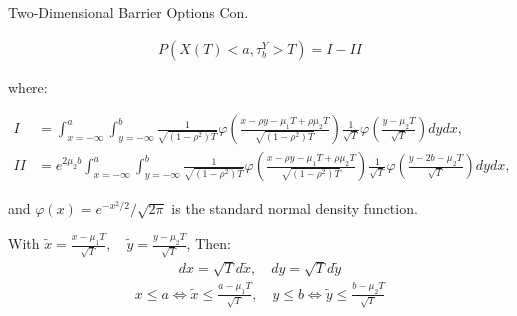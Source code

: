\documentclass{beamer}
\begin{document}
\begin{frame}{Two-Dimensional Barrier Options Con.}

    {\footnotesize \footnotesize
    \begin{align*}
        P(X(T)<a, \tau_b^Y >T)=I - II
    \end{align*}
    \par where:
     {\footnotesize \tiny
    \begin{align*}
        I &= \int_{x=-\infty}^a \int_{y=-\infty}^b \frac{1}{\sqrt{(1-\rho^2)T}} \varphi \left( \frac{x-\rho y-\mu_1 T+\rho\mu_2 T}{\sqrt{(1-\rho^2)T}} \right) \frac{1}{\sqrt{T}} \varphi \left( \frac{y-\mu_2 T}{\sqrt{T}} \right) dy dx, \\
        II &= e^{2\mu_2 b} \int_{x=-\infty}^a \int_{y=-\infty}^b \frac{1}{\sqrt{(1-\rho^2)T}} \varphi \left( \frac{x-\rho y-\mu_1 T+\rho\mu_2 T}{\sqrt{(1-\rho^2)T}} \right) \frac{1}{\sqrt{T}} \varphi \left( \frac{y-2b-\mu_2 T}{\sqrt{T}} \right) dy dx,
        \end{align*}
    
     }
     \par and \(\varphi(x)=e^{-x^2/2}/\sqrt{2\pi}\) is the standard normal density function. \pause
     \vspace{1em}
     \par With $\tilde{x}=\frac{x-\mu_1 T}{\sqrt{T}}, \quad \tilde{y}=\frac{y-\mu_2 T}{\sqrt{T}}$, Then:
     \begin{align*}
        dx = \sqrt{T}  d\tilde{x}, \quad dy = \sqrt{T}  d\tilde{y}
     \end{align*}
     \begin{align*}
        x \leq a \iff \tilde{x} \leq \frac{a - \mu_1 T}{\sqrt{T}}, \quad y \leq b \iff \tilde{y} \leq \frac{b - \mu_2 T}{\sqrt{T}}
     \end{align*}

    }
    
\end{frame}
\end{document}
